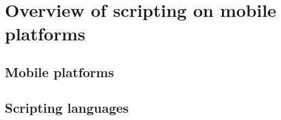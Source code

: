 \chapter{Overview of scripting on mobile platforms}
\section{Mobile platforms}
\section{Scripting languages}
